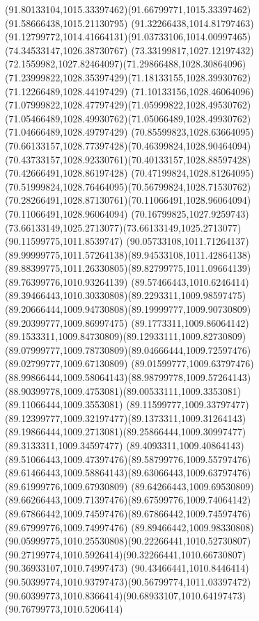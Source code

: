 {{\curveto(91.80133104,1015.33397462)(91.66799771,1015.33397462)(91.58666438,1015.21130795)
\curveto(91.32266438,1014.81797463)(91.12799772,1014.41664131)(91.03733106,1014.00997465)
\lineto(74.34533147,1026.38730767)
\curveto(73.33199817,1027.12197432)(72.1559982,1027.82464097)(71.29866488,1028.30864096)
\curveto(71.23999822,1028.35397429)(71.18133155,1028.39930762)(71.12266489,1028.44197429)
\curveto(71.10133156,1028.46064096)(71.07999822,1028.47797429)(71.05999822,1028.49530762)
\curveto(71.05466489,1028.49930762)(71.05066489,1028.49930762)(71.04666489,1028.49797429)
\curveto(70.85599823,1028.63664095)(70.66133157,1028.77397428)(70.46399824,1028.90464094)
\curveto(70.43733157,1028.92330761)(70.40133157,1028.88597428)(70.42666491,1028.86197428)
\curveto(70.47199824,1028.81264095)(70.51999824,1028.76464095)(70.56799824,1028.71530762)
\curveto(70.28266491,1028.87130761)(70.11066491,1028.96064094)(70.11066491,1028.96064094)
\curveto(70.16799825,1027.9259743)(73.66133149,1025.2713077)(73.66133149,1025.2713077)
\lineto(90.11599775,1011.8539747)
\curveto(90.05733108,1011.71264137)(89.99999775,1011.57264138)(89.94533108,1011.42864138)
\curveto(89.88399775,1011.26330805)(89.82799775,1011.09664139)(89.76399776,1010.93264139)
\curveto(89.57466443,1010.6246414)(89.39466443,1010.30330808)(89.2293311,1009.98597475)
\curveto(89.20666444,1009.94730808)(89.19999777,1009.90730809)(89.20399777,1009.86997475)
\curveto(89.1773311,1009.86064142)(89.1533311,1009.84730809)(89.12933111,1009.82730809)
\curveto(89.07999777,1009.78730809)(89.04666444,1009.72597476)(89.02799777,1009.67130809)
\curveto(89.01599777,1009.63797476)(88.99866444,1009.58064143)(88.98799778,1009.57264143)
\curveto(88.90399778,1009.4753081)(89.00533111,1009.3353081)(89.11066444,1009.3553081)
\curveto(89.11599777,1009.33797477)(89.12399777,1009.32197477)(89.1373311,1009.31264143)
\curveto(89.19866444,1009.2713081)(89.25866444,1009.30997477)(89.3133311,1009.34597477)
\curveto(89.4093311,1009.40864143)(89.51066443,1009.47397476)(89.58799776,1009.55797476)
\curveto(89.61466443,1009.58864143)(89.63066443,1009.63797476)(89.61999776,1009.67930809)
\curveto(89.64266443,1009.69530809)(89.66266443,1009.71397476)(89.67599776,1009.74064142)
\curveto(89.67866442,1009.74597476)(89.67866442,1009.74597476)(89.67999776,1009.74997476)
\curveto(89.89466442,1009.98330808)(90.05999775,1010.25530808)(90.22266441,1010.52730807)
\curveto(90.27199774,1010.5926414)(90.32266441,1010.66730807)(90.36933107,1010.74997473)
\curveto(90.43466441,1010.8446414)(90.50399774,1010.93797473)(90.56799774,1011.03397472)
\curveto(90.60399773,1010.8366414)(90.68933107,1010.64197473)(90.76799773,1010.5206414)
}}
